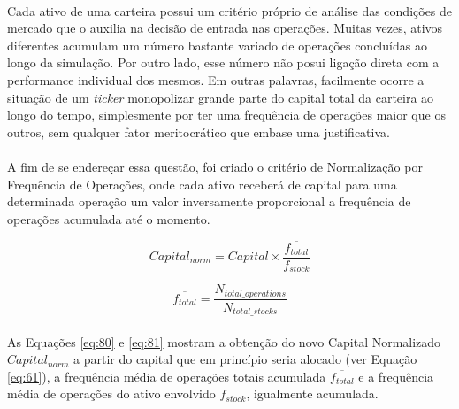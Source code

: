 \paragraph{} Cada ativo de uma carteira possui um critério próprio de análise das condições de mercado que o auxilia na decisão de entrada nas operações. Muitas vezes, ativos diferentes acumulam um número bastante variado de operações concluídas ao longo da simulação. Por outro lado, esse número não posui ligação direta com a performance individual dos mesmos. Em outras palavras, facilmente ocorre a situação de um \textit{ticker} monopolizar grande parte do capital total da carteira ao longo do tempo, simplesmente por ter uma frequência de operações maior que os outros, sem qualquer fator meritocrático que embase uma justificativa.

\paragraph{} A fim de se endereçar essa questão, foi criado o critério de Normalização por Frequência de Operações, onde cada ativo receberá de capital para uma determinada operação um valor inversamente proporcional a frequência de operações acumulada até o momento.

\begin{equation} \label{eq:80}
    Capital_{norm} = Capital \times \dfrac{ \overline{f_{total}} }{ f_{stock}}
\end{equation}

\begin{equation} \label{eq:81}
    \overline{f_{total}} = \dfrac{ N_{total\_operations} }{ N_{total\_stocks} }
\end{equation}

\paragraph{} As Equações \ref{eq:80} e \ref{eq:81} mostram a obtenção do novo Capital Normalizado \begin{math} Capital_{norm} \end{math} a partir do capital que em princípio seria alocado (ver Equação \ref{eq:61}), a frequência média de operações totais acumulada \begin{math} \overline{f_{total}} \end{math} e a frequência média de operações do ativo envolvido \begin{math} f_{stock} \end{math}, igualmente acumulada.

